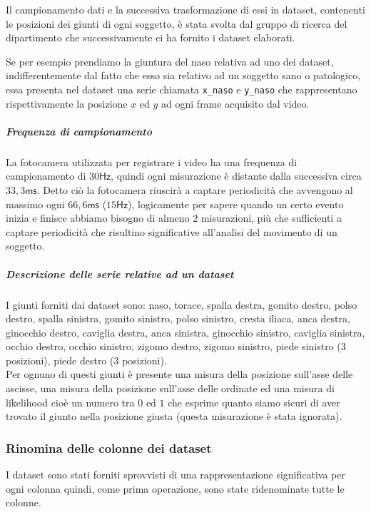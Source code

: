 Il campionamento dati e la successiva trasformazione di essi in dataset, contenenti le posizioni
dei giunti di ogni soggetto, è stata svolta dal gruppo di ricerca del dipartimento che successivamente
ci ha fornito i dataset elaborati.


\begin{esempio}
    Se per esempio prendiamo la giuntura del naso relativa ad uno dei dataset, indifferentemente
    dal fatto che esso sia relativo ad un soggetto sano o patologico, essa presenta nel dataset una serie
    chiamata \texttt{x\_naso} e \texttt{y\_naso} che rappresentano rispettivamente 
    la posizione $x$ ed $y$ ad ogni frame acquisito dal video.
\end{esempio}

\subparagraph*{Frequenza di campionamento}
La fotocamera utilizzata per registrare i video ha una frequenza di campionamento di 
$30\mathsf{Hz}$, quindi ogni misurazione è distante dalla successiva circa $33,3\mathsf{ms}$.
Detto ciò la fotocamera riuscirà a captare periodicità che avvengono al massimo ogni $66,6\mathsf{ms}$
($15\mathsf{Hz}$), logicamente per sapere quando un certo evento inizia e finisce abbiamo
bisogno di almeno $2$ misurazioni, più che sufficienti a captare periodicità che risultino
significative all'analisi del movimento di un soggetto.

\subparagraph*{Descrizione delle serie relative ad un dataset}
I giunti forniti dai dataset sono: naso, torace, spalla destra, gomito destro, polso destro, 
spalla sinistra, gomito sinistro, polso sinistro, cresta iliaca, anca destra, ginocchio destro, 
caviglia destra, anca sinistra, ginocchio sinistro, caviglia sinistra, occhio destro, 
occhio sinistro, zigomo destro, zigomo sinistro, piede sinistro ($3$ posizioni), 
piede destro ($3$ posizioni).\\
Per ognuno di questi giunti è presente una misura della posizione sull'asse delle ascisse, 
una misura della posizione sull'asse delle ordinate ed una misura di likelihood cioè un numero
tra $0$ ed $1$ che esprime quanto siamo sicuri di aver trovato il giunto nella posizione giusta
(questa misurazione è stata ignorata).

\subsubsection{Rinomina delle colonne dei dataset}
I dataset sono stati forniti sprovvisti di una rappresentazione significativa per ogni colonna
quindi, come prima operazione, sono state ridenominate tutte le colonne.

